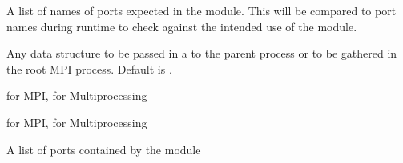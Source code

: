 \documentclass[letterpaper,10pt,openany,oneside,english]{sphinxmanual}
\begin{document}
\begin{fulllineitems}
\begin{fulllineitems}
\begin{fulllineitems}
\end{fulllineitems}


\begin{fulllineitems}
\label{\detokenize{src_rst/module:module.Module.port_names_expected}}
 \textendash{} A list of names of ports expected in the module. This will be compared
to port names during runtime to check against the intended use of the
module.

\end{fulllineitems}


\begin{fulllineitems}
\label{\detokenize{src_rst/module:module.Module.state}}
 \textendash{} Any  data structure to be passed in a 
to the parent process or to be gathered in the root MPI process.
Default is .

\end{fulllineitems}


\begin{fulllineitems}
\label{\detokenize{src_rst/module:module.Module.use_mpi}}
 \textendash{}  for MPI,  for Multiprocessing

\end{fulllineitems}


\begin{fulllineitems}
\label{\detokenize{src_rst/module:module.Module.use_multiprocessing}}
 \textendash{}  for MPI,  for Multiprocessing

\end{fulllineitems}


\begin{fulllineitems}
\label{\detokenize{src_rst/module:module.Module.ports}}
 \textendash{} A list of ports contained by the module


\end{fulllineitems}
\end{fulllineitems}
\end{fulllineitems}
\end{document}
